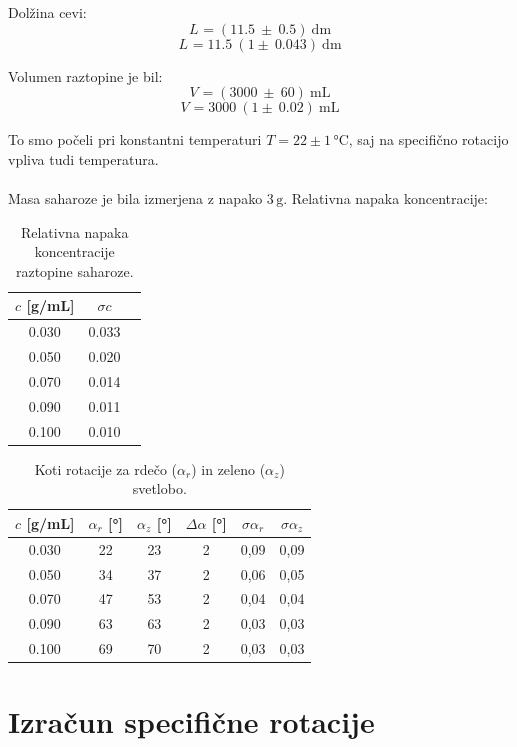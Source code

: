 \documentclass[9pt,a4paper,twocolumn,twoside]{tau-class/tau}
\newcommand{\abserr}[5]{
    \ensuremath{#1_{#2} = (#3 \ \pm \ #4) \ #5}
}
\newcommand{\relerr}[5]{
    \ensuremath{#1_{#2} = #3 \ (1 \pm \ #4) \ #5}
}
\begin{document}
Dolžina cevi:
\[
\abserr{L}{}{11.5}{0.5}{\text{dm}}
\]
\[
\relerr{L}{}{11.5}{0.043}{\text{dm}}
\]

Volumen raztopine je bil:
\[
\abserr{V}{}{3000}{60}{\text{mL}}
\]
\[
\relerr{V}{}{3000}{0.02}{\text{mL}}
\]

To smo počeli pri konstantni temperaturi $T = 22 \pm 1 \, \text{°C}$, saj 
na specifično rotacijo vpliva tudi temperatura.\\\\

Masa saharoze je bila izmerjena z napako $3\,\text{g}$. Relativna napaka koncentracije:

\begin{table}[H]
\centering
\begin{tabular}{ccc}
\toprule
$c$ [g/mL] & $\sigma c$ \\
\midrule
0.030 & 0.033 \\
0.050 & 0.020 \\
0.070 & 0.014 \\
0.090 & 0.011 \\
0.100 & 0.010 \\
\bottomrule
\end{tabular}
\caption{Relativna napaka koncentracije raztopine saharoze.}
\end{table}


\begin{table}[H]
\centering
\begin{tabular}{cccccc}
\toprule
$c$ [g/mL] & $\alpha_r$ [°] & $\alpha_z$ [°]  & $\Delta \alpha$ [°] & $\sigma \alpha_r$ & $\sigma \alpha_z$ \\
\midrule
0.030 & 22 & 23 & 2 & 0,09 & 0,09 \\
0.050 & 34 & 37 & 2 & 0,06 & 0,05 \\
0.070 & 47 & 53 & 2 & 0,04 & 0,04 \\
0.090 & 63 & 63 & 2 & 0,03 & 0,03 \\
0.100 & 69 & 70 & 2 & 0,03 & 0,03 \\
\bottomrule
\end{tabular}
\caption{Koti rotacije za rdečo ($\alpha_r$) in zeleno ($\alpha_z$) svetlobo.}
\end{table}


\section{Izračun specifične rotacije}
\end{document}

